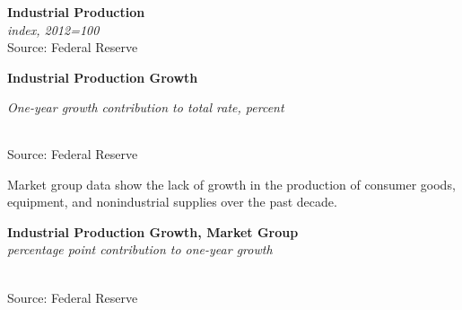 \documentclass{report}
\makeatletter
\newcommand{\tbllink}[1]{\href{https://raw.githubusercontent.com/bdecon/US-chartbook/master/chartbook/data/#1}{\faTable}}
\newcommand*\short[1]{\expandafter\@gobbletwo\number\numexpr#1\relax}
\newcommand{\sbar}[4]{
		\addplot[ybar stacked, bar width=2.6pt, draw opacity=0, fill=#1] 
			table [x=#2, y=#3, col sep=comma]{#4};}
\newcommand{\dateaxisticks}{
		date coordinates in=x, axis line style={draw=none},
		xmax={2020-05-10},
		max space between ticks=40,	    
		xtick={{1990-01-01}, {1992-01-01}, {1994-01-01}, 
			{1996-01-01}, {1998-01-01}, {2000-01-01}, 
			{2002-01-01}, {2004-01-01}, {2006-01-01},
			{2008-01-01}, {2010-01-01}, {2012-01-01}, {2014-01-01},
		    {2016-01-01}, {2018-01-01}, {2020-01-01}},
		minor xtick={{1989-01-01}, {1991-01-01}, {1993-01-01},
			{1995-01-01}, {1997-01-01}, {1999-01-01}, 
			{2001-01-01}, {2003-01-01}, {2005-01-01}, {2007-01-01},
		    {2009-01-01}, {2011-01-01}, {2013-01-01}, {2015-01-01},
		    {2017-01-01}, {2019-01-01}},
		enlarge y limits={0.06}, enlarge x limits={0.01},
		}
\newcommand{\bbar}[2]{extra #1 ticks = {{#2}}, extra #1 tick labels = ,
		extra #1 tick style = {grid=major, grid style={thick, black!25}},}
\newcommand{\rbars}{
		\fill[color=black!10] (axis cs:{1990-07-01},\pgfkeysvalueof{/pgfplots/ymin}) rectangle 
			(axis cs:{1991-03-01}, \pgfkeysvalueof{/pgfplots/ymax});
		\fill[color=black!10] (axis cs:{2007-12-01},\pgfkeysvalueof{/pgfplots/ymin}) rectangle 
			(axis cs:{2009-07-01}, \pgfkeysvalueof{/pgfplots/ymax});
		\fill[color=black!10] (axis cs:{2001-03-01},\pgfkeysvalueof{/pgfplots/ymin}) rectangle 
			(axis cs:{2001-11-01}, \pgfkeysvalueof{/pgfplots/ymax});}
\makeatother
\begin{document}
{{{{{{\begin{minipage}{0.62\textwidth}
\end{minipage}\hspace{7mm}
\begin{minipage}{0.35\textwidth}

\noindent \normalsize \textbf{Industrial Production}\\
\footnotesize{\textit{index, 2012=100}}\\

\footnotesize{Source: Federal Reserve} \hfill \tbllink{indpro.csv}

\end{minipage}


\vspace{2mm} 

\noindent \normalsize \textbf{Industrial Production Growth}\\
\footnotesize{\textit{One-year growth \hspace{34mm} contribution to total \hspace{12mm} rate, percent}\\ 
\noindent {} \setlength{\tabcolsep}{3.1pt} \color{black!90}
		{\renewcommand{\arraystretch}{1.54}
		 \begin{tabular}{p{2mm} p{44mm} R{7.3mm} R{7.3mm} R{7.3mm} R{7.3mm} | R{8mm} R{7.3mm} 
		   R{7.3mm} R{7.3mm} }
			 \hline
		\end{tabular}}	
		
\footnotesize{Source: Federal Reserve}}


\newpage

\begin{minipage}{0.76\textwidth}

\vspace{3mm}

\small Market group data show the lack of growth in the production of consumer goods, equipment, and nonindustrial supplies over the past decade.\\

\vspace{1mm}

\noindent \normalsize \textbf{Industrial Production Growth, Market Group}\\
\footnotesize{\textit{percentage point contribution to one-year growth}}\\
\noindent \hspace*{-2mm} \\
\footnotesize{Source: Federal Reserve} \hfill \tbllink{indprogr.csv}\\


\end{minipage}}}}}}}
\end{document}
